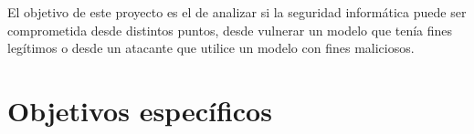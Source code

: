 El objetivo de este proyecto es el de analizar si la seguridad informática puede ser comprometida desde distintos puntos, desde vulnerar un modelo que tenía fines legítimos o desde un atacante que utilice un modelo con fines maliciosos.

\section{Objetivos específicos}



